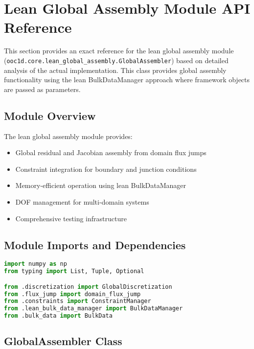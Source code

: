 %

\section{Lean Global Assembly Module API Reference}
\label{sec:lean_global_assembly_api}

This section provides an exact reference for the lean global assembly module (\texttt{ooc1d.core.lean\_global\_assembly.GlobalAssembler}) based on detailed analysis of the actual implementation. This class provides global assembly functionality using the lean BulkDataManager approach where framework objects are passed as parameters.

\subsection{Module Overview}

The lean global assembly module provides:
\begin{itemize}
    \item Global residual and Jacobian assembly from domain flux jumps
    \item Constraint integration for boundary and junction conditions
    \item Memory-efficient operation using lean BulkDataManager
    \item DOF management for multi-domain systems
    \item Comprehensive testing infrastructure
\end{itemize}

\subsection{Module Imports and Dependencies}

\begin{lstlisting}[language=Python, caption=Module Dependencies]
import numpy as np
from typing import List, Tuple, Optional

from .discretization import GlobalDiscretization
from .flux_jump import domain_flux_jump
from .constraints import ConstraintManager
from .lean_bulk_data_manager import BulkDataManager
from .bulk_data import BulkData
\end{lstlisting}

\subsection{GlobalAssembler Class}
\label{subsec:lean_global_assembler_class}

